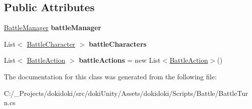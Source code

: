 \subsection*{Public Attributes}
\begin{DoxyCompactItemize}
\item 
\hyperlink{class_battle_manager}{Battle\+Manager} {\bfseries battle\+Manager}\hypertarget{class_battle_turn_aae06c5d9a109caf1143e72fa7c2f0c74}{}\label{class_battle_turn_aae06c5d9a109caf1143e72fa7c2f0c74}

\item 
List$<$ \hyperlink{class_battle_character}{Battle\+Character} $>$ {\bfseries battle\+Characters}\hypertarget{class_battle_turn_a31c9e89d119ac7754275d12b58a66c2f}{}\label{class_battle_turn_a31c9e89d119ac7754275d12b58a66c2f}

\item 
List$<$ \hyperlink{class_battle_action}{Battle\+Action} $>$ {\bfseries battle\+Actions} = new List$<$\hyperlink{class_battle_action}{Battle\+Action}$>$()\hypertarget{class_battle_turn_a2d6a31a7161897943d712db21d30da71}{}\label{class_battle_turn_a2d6a31a7161897943d712db21d30da71}

\end{DoxyCompactItemize}


The documentation for this class was generated from the following file\+:\begin{DoxyCompactItemize}
\item 
C\+:/\+\_\+\+Projects/dokidoki/src/doki\+Unity/\+Assets/dokidoki/\+Scripts/\+Battle/Battle\+Turn.\+cs\end{DoxyCompactItemize}
